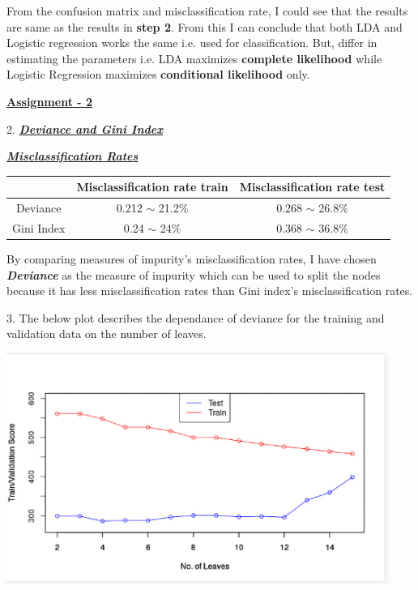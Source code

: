 \documentclass[a4paper,10pt]{article}
\begin{document}
  From the confusion matrix and misclassification rate, I could see that the results are 
  same as the results in \textbf{step 2}. From this I can conclude that both LDA and Logistic regression works the same i.e. used for classification.
  But, differ in estimating the parameters i.e. LDA maximizes \textbf{complete likelihood} while Logistic Regression maximizes \textbf{conditional likelihood} only. \par
\newpage
\textbf{\underline{Assignment - 2}} \par
2. \textbf{\textit{\underline{Deviance and Gini Index}}} \par
\vspace{0.5cm}
\textbf{\textit{\underline{Misclassification Rates}}}
\begin{center}
  \begin{tabular}{|c|c|c|}
    \hline
    & Misclassification rate train & Misclassification rate test\\
    \hline
    Deviance &0.212 $\sim$ 21.2\% & 0.268 $\sim$ 26.8\% \\
    \hline
    Gini Index &0.24 $\sim$ 24\% & 0.368 $\sim$ 36.8\%\\
    \hline
  \end{tabular}
\end{center}\par
\vspace{0.5cm}
By comparing measures of impurity's misclassification rates, I have chosen \textbf{\textit{Deviance}}
as the measure of impurity which can be used to split the nodes because it has less misclassification 
rates than Gini index's misclassification rates.
\par
3. The below plot describes the dependance of deviance for the training and validation data on the number of leaves. \par
\begin{center}
  \includegraphics[width=125mm,scale=0.10]{Deviance_Dependance_train_validation_plot.png} 
\end{center} \newpage
\end{document}
